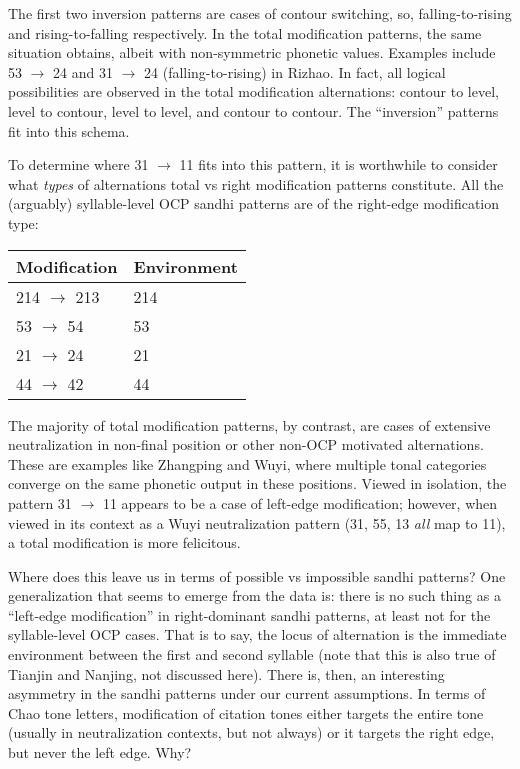 \documentclass{article}
\begin{document}
 The first two inversion patterns are cases of contour switching, so, falling-to-rising and rising-to-falling respectively. In the total modification patterns, the same situation obtains, albeit with non-symmetric phonetic values. Examples include 53 $\rightarrow$ 24 and 31 $\rightarrow$ 24 (falling-to-rising) in Rizhao. In fact, all logical possibilities are observed in the total modification alternations: contour to level, level to contour, level to level, and contour to contour. The ``inversion'' patterns fit into this schema. \par
To determine where 31 $\rightarrow$ 11 fits into this pattern, it is worthwhile to consider what \emph{types} of alternations total vs right modification patterns constitute. All the (arguably) syllable-level OCP sandhi patterns are of the right-edge modification type:
\begin{exe}
\ex
\begin{tabular}[t]{ll}
Modification & Environment \\
\hline
214 $\rightarrow$ 213 & \underline{\hspace{1em}} 214 \\
53 $\rightarrow$ 54 & \underline{\hspace{1em}} 53 \\
21 $\rightarrow$ 24 & \underline{\hspace{1em}} 21 \\
44 $\rightarrow$ 42 & \underline{\hspace{1em}} 44 \\
\end{tabular}
\end{exe}
The majority of total modification patterns, by contrast, are cases of extensive neutralization in non-final position or other non-OCP motivated alternations. These are examples like Zhangping and Wuyi, where multiple tonal categories converge on the same phonetic output in these positions. Viewed in isolation, the pattern 31 $\rightarrow$ 11 appears to be a case of left-edge modification; however, when viewed in its context as a Wuyi neutralization pattern (31, 55, 13 \emph{all} map to 11), a total modification is more felicitous. \par
Where does this leave us in terms of possible vs impossible sandhi patterns? One generalization that seems to emerge from the data is: there is no such thing as a ``left-edge modification'' in right-dominant sandhi patterns, at least not for the syllable-level OCP cases. That is to say, the locus of alternation is the immediate environment between the first and second syllable (note that this is also true of Tianjin and Nanjing, not discussed here). There is, then, an interesting asymmetry in the sandhi patterns under our current assumptions. In terms of Chao tone letters, modification of citation tones either targets the entire tone (usually in neutralization contexts, but not always) or it targets the right edge, but never the left edge. Why? \par
\end{document}
